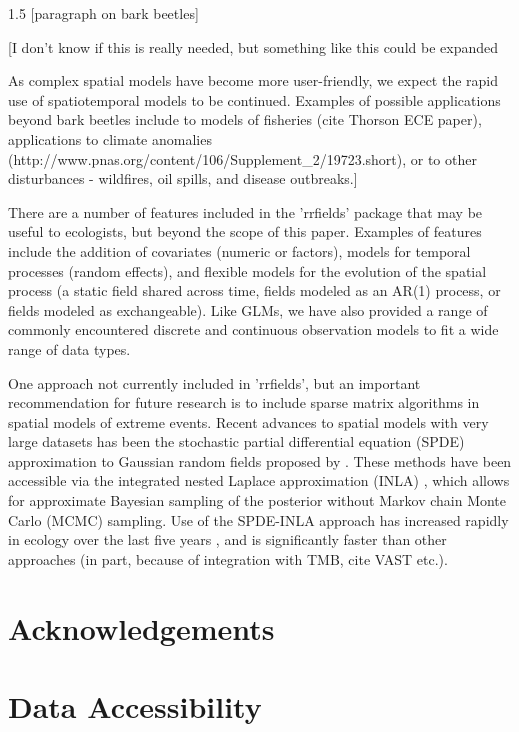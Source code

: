 \documentclass[12pt,english]{article}
\begin{document}
\begin{spacing}{1.5}
[paragraph on bark beetles]

[I don't know if this is really needed, but something like this could be expanded

As complex spatial models have become more user-friendly, we expect the rapid use
of spatiotemporal models to be continued. Examples of possible applications beyond
bark beetles include to models of fisheries (cite Thorson ECE paper), applications
to climate anomalies (http://www.pnas.org/content/106/Supplement\_2/19723.short),
or to other disturbances - wildfires, oil spills, and disease outbreaks.]

There are a number of features included in the 'rrfields' package that may be
useful to ecologists, but beyond the scope of this paper. Examples of features
include the addition of covariates (numeric or factors), models for temporal
processes (random effects), and flexible models for the evolution of the spatial
process (a static field shared across time, fields modeled as an AR(1) process,
or fields modeled as exchangeable). Like GLMs, we have also provided a range of
commonly encountered discrete and continuous observation models to fit a wide
range of data types.

One approach not currently included in 'rrfields', but an important recommendation
for future research is to include sparse matrix algorithms in spatial models of
extreme events. Recent advances to spatial models with very large datasets has
been the stochastic partial differential equation (SPDE)  approximation to
Gaussian random fields proposed by \citet{lindgren2011}. These methods have
been accessible via the integrated nested Laplace approximation (INLA)
\citep{rue2009}, which allows for approximate Bayesian sampling of the posterior
without Markov chain Monte Carlo (MCMC) sampling. Use of the SPDE-INLA approach has
increased rapidly in ecology over the last five years \citep[e.g.][]{illian2013, ono2016},
and is significantly faster than other approaches (in part, because of integration with
TMB, cite VAST etc.).

\section{Acknowledgements}

\section{Data Accessibility}


\end{spacing}
\end{document}
